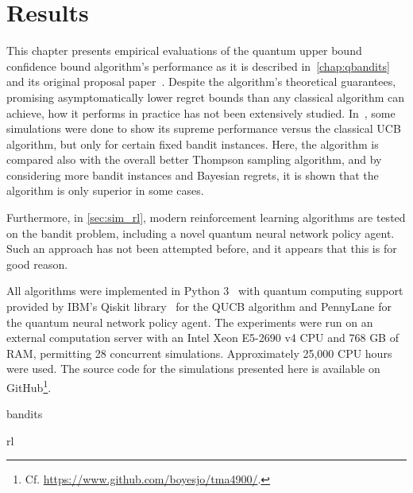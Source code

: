 \chapter{Results}
\label{chap:simulations}

This chapter presents empirical evaluations of the quantum upper bound confidence bound algorithm's performance as it is described in~\cref{chap:qbandits} and its original proposal paper~\autocite{wan2022}.
Despite the algorithm's theoretical guarantees, promising asymptomatically lower regret bounds than any classical algorithm can achieve, how it performs in practice has not been extensively studied.
In~\autocite{wan2022}, some simulations were done to show its supreme performance versus the classical UCB algorithm, but only for certain fixed bandit instances.
Here, the algorithm is compared also with the overall better Thompson sampling algorithm, and by considering more bandit instances and Bayesian regrets, it is shown that the algorithm is only superior in some cases.

Furthermore, in \cref{sec:sim_rl}, modern reinforcement learning algorithms are tested on the bandit problem, including a novel quantum neural network policy agent.
Such an approach has not been attempted before, and it appears that this is for good reason.

All algorithms were implemented in Python 3~\autocite{python} with quantum computing support provided by IBM's Qiskit library~\autocite{qiskit} for the QUCB algorithm and PennyLane for the quantum neural network policy agent.
The experiments were run on an external computation server with an Intel Xeon E5-2690 v4 CPU and 768 GB of RAM, permitting 28 concurrent simulations.
Approximately 25,000 CPU hours were used.
The source code for the simulations presented here is available on GitHub\footnote{
    Cf. \url{https://www.github.com/boyesjo/tma4900/}.
}.



{bandits}
\clearpage



{rl}
